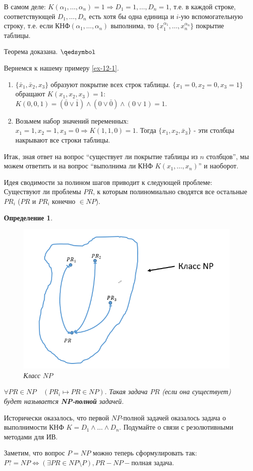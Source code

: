\documentclass{article}
\newtheorem{definition}{Определение}
\numberwithin{example}{section}
\numberwithin{question}{section}
\numberwithin{Remark}{section}
\numberwithin{theorem}{section}
\numberwithin{definition}{section}
\numberwithin{proposition}{section}
\begin{document}
В самом деле: $K(\alpha_1,\ldots,\alpha_n)=1\Rightarrow D_1=1,\ldots,D_n=1$, т.е. в каждой строке, соответствующей $D_1,\ldots,D_n$ есть хотя бы одна единица и $i$-ую вспомогательную строку, т.е. если КНФ$(\alpha_1,\ldots,\alpha_n)$ выполнима, то $\{x_1^{\alpha_1},\ldots,x_n^{\alpha_n} \}$ покрытие таблицы. 

Теорема доказана. $\qedsymbol$

Вернемся к нашему примеру \ref{ex-12-1}.
\begin{enumerate}
	\item $\{\bar{x}_1,\bar{x}_2,x_3 \}$ образуют покрытие всех строк таблицы. $\{x_1=0,x_2=0,x_3=1 \}$ обращают $K(x_1,x_2,x_3)=1$: $K(0,0,1)=(\bar{0}\vee \bar{1})\wedge(0\vee \bar{0})\wedge(0\vee 1)=1$.
	\item Возьмем набор значений переменных: $x_1=1,x_2=1,x_3=0\Rightarrow K(1,1,0)=1$. Тогда $\{x_1,x_2,\bar{x}_3 \}$ - эти столбцы накрывают все строки таблицы.
\end{enumerate}
Итак, зная ответ на вопрос ``существует ли покрытие таблицы из $n$ столбцов'', мы можем ответить и на вопрос ``выполнима ли КНФ $K(x_1,\ldots,x_n)$'' и наоборот.

Идея сводимости за полином шагов приводит к следующей проблеме: Существуют ли проблемы $PR$, к которым полиномиально сводятся все остальные $PR_i$ ($PR$ и $PR_i$ конечно $\in NP$).
\begin{definition}
	\begin{figure}[!htp]
		\centering
		\includegraphics[width=0.5\linewidth]{12-3}
		\caption{Класс $NP$}
	\end{figure}
	$\forall PR\in NP\quad (PR_i\mapsto PR\in NP)$. Такая задача $PR$ (если она существует) будет называется \textbf{NP-полной} задачей.
\end{definition}
Исторически оказалось, что первой $NP$-полной задачей оказалось задача о выполнимости КНФ $K=D_1\wedge\ldots\wedge D_n$. Подумайте о связи с резолютивными методами для ИВ. 

Заметим, что вопрос $P=NP$ можно теперь сформулировать так: $P?=NP\Leftrightarrow (\exists PR\in NP\setminus P),PR - NP-\text{полная задача}$.
\end{document}
